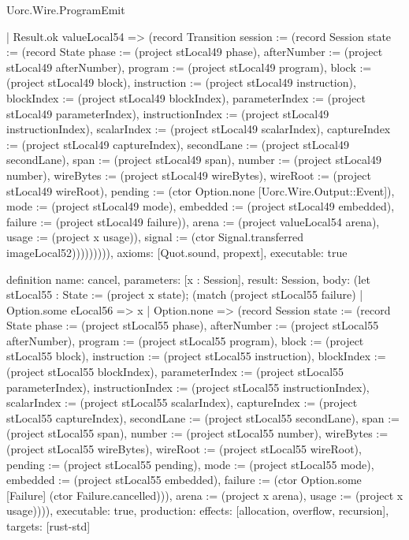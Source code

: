 \begin{lexlean}{Uorc.Wire.ProgramEmit}
\begin{semanticmodule}
{          | Result.ok valueLocal54 => (record Transition {session := (record Session {state := (record State {phase := (project stLocal49 phase), afterNumber := (project stLocal49 afterNumber), program := (project stLocal49 program), block := (project stLocal49 block), instruction := (project stLocal49 instruction), blockIndex := (project stLocal49 blockIndex), parameterIndex := (project stLocal49 parameterIndex), instructionIndex := (project stLocal49 instructionIndex), scalarIndex := (project stLocal49 scalarIndex), captureIndex := (project stLocal49 captureIndex), secondLane := (project stLocal49 secondLane), span := (project stLocal49 span), number := (project stLocal49 number), wireBytes := (project stLocal49 wireBytes), wireRoot := (project stLocal49 wireRoot), pending := (ctor Option.none [Uorc.Wire.Output::Event]), mode := (project stLocal49 mode), embedded := (project stLocal49 embedded), failure := (project stLocal49 failure)}), arena := (project valueLocal54 arena), usage := (project x usage)}), signal := (ctor Signal.transferred imageLocal52)})))))))),
  axioms: [Quot.sound, propext],
  executable: true
}

definition{
  name: cancel,
  parameters: [x : Session],
  result: Session,
  body: (let stLocal55 : State := (project x state); (match (project stLocal55 failure)
    | Option.some eLocal56 => x
    | Option.none => (record Session {state := (record State {phase := (project stLocal55 phase), afterNumber := (project stLocal55 afterNumber), program := (project stLocal55 program), block := (project stLocal55 block), instruction := (project stLocal55 instruction), blockIndex := (project stLocal55 blockIndex), parameterIndex := (project stLocal55 parameterIndex), instructionIndex := (project stLocal55 instructionIndex), scalarIndex := (project stLocal55 scalarIndex), captureIndex := (project stLocal55 captureIndex), secondLane := (project stLocal55 secondLane), span := (project stLocal55 span), number := (project stLocal55 number), wireBytes := (project stLocal55 wireBytes), wireRoot := (project stLocal55 wireRoot), pending := (project stLocal55 pending), mode := (project stLocal55 mode), embedded := (project stLocal55 embedded), failure := (ctor Option.some [Failure] (ctor Failure.cancelled))}), arena := (project x arena), usage := (project x usage)}))),
  executable: true,
  production: {effects: [allocation, overflow, recursion], targets: [rust-std]}
}


\end{semanticmodule}
\end{lexlean}
